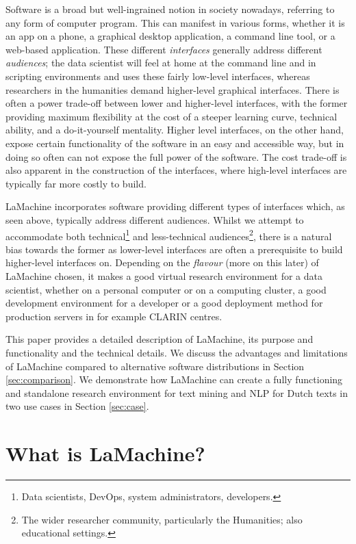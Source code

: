 \documentclass[a4paper,11pt]{article}
\begin{document}
Software is a broad but well-ingrained notion in society nowadays, referring to any form of computer program. This can
manifest in various forms, whether it is an app on a phone, a graphical desktop application, a command line tool, or a
web-based application. These different \emph{interfaces} generally address different \emph{audiences}; the data
scientist will feel at home at the command line and in scripting environments and uses these fairly low-level
interfaces, whereas researchers in the humanities demand higher-level graphical interfaces. There is often a power trade-off
between lower and higher-level interfaces, with the former providing maximum flexibility at the cost of a steeper
learning curve, technical ability, and a do-it-yourself mentality. Higher level interfaces, on the other
hand, expose certain functionality of the software in an easy and accessible way, but in doing so often can not expose
the full power of the software. The cost trade-off is also apparent in the construction of the interfaces, where
high-level interfaces are typically far more costly to build.

LaMachine incorporates software providing different types of interfaces which, as seen above, typically address different audiences. Whilst we
attempt to accommodate both technical\footnote{Data scientists, DevOps, system administrators, developers.} and
less-technical audiences\footnote{The wider researcher community, particularly the Humanities; also educational
settings.}, there is a natural bias towards the former as lower-level interfaces are often a prerequisite to build
higher-level interfaces on. Depending on the \emph{flavour} (more on this later) of LaMachine chosen, it makes a good virtual research
environment for a data scientist, whether on a personal computer or on a computing cluster, a good development
environment for a developer or a good deployment method for production servers in for example CLARIN centres.

 This paper provides a detailed description of LaMachine, its purpose and functionality and the technical details. We
 discuss the advantages and limitations of LaMachine compared to alternative software distributions in Section \ref{sec:comparison}. We demonstrate how LaMachine can create a fully functioning and standalone research environment for text mining  and NLP for Dutch texts in two use cases in Section \ref{sec:case}.

 \section{What is LaMachine?}
\end{document}
